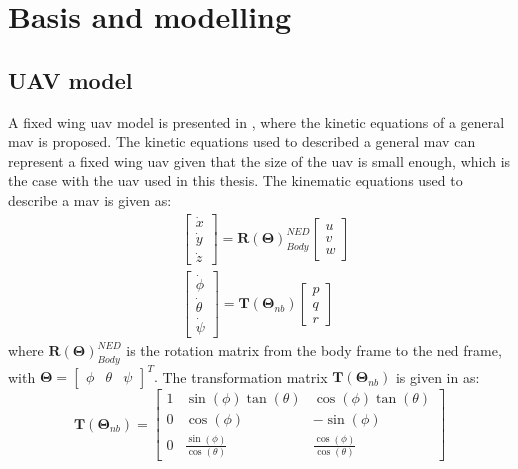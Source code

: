 \chapter{Basis and modelling}
\section{UAV model}
A fixed wing \gls{uav} model is presented in \citep{beard2012small}, where the kinetic equations of a general \gls{mav} is proposed. The kinetic equations used to described a general \gls{mav} can represent a fixed wing \gls{uav} given that the size of the \gls{uav} is small enough, which is the case with the \gls{uav} used in this thesis. The kinematic equations used to describe a \gls{mav} is given as:
\begin{subequations}
\label{eq:kinematics}
\begin{align}\label{eq:kinematicsPosition}
& \begin{bmatrix}
\dot{x} \\
\dot{y} \\
\dot{z}
\end{bmatrix}
=
 \mathbf{R}(\mathbf{\Theta})_{Body}^{NED}\begin{bmatrix}
 u \\
 v \\
 w
 \end{bmatrix} \\
& \begin{bmatrix}
\dot{\phi} \\
\dot{\theta} \\
\dot{\psi}
\end{bmatrix}
= 
\mathbf{T}(\mathbf{\Theta}_{nb})\begin{bmatrix}
p \\
q \\
r
\end{bmatrix}\label{eq:kinematicsAttitude}
\end{align}
\end{subequations}
where $\mathbf{R}(\mathbf{\Theta})_{Body}^{NED}$ is the rotation matrix from the body frame to the \gls{ned} frame, with $\mathbf{\Theta} = \begin{bmatrix}
\phi & \theta & \psi
\end{bmatrix}^T.$ The transformation matrix $\mathbf{T}(\mathbf{\Theta}_{nb})$ is given in \citep{fossen2011handbook} as:
\begin{equation}
\mathbf{T}(\mathbf{\Theta}_{nb}) = \begin{bmatrix}
1 & \sin(\phi)\tan(\theta) & \cos(\phi)\tan(\theta) \\
0 & \cos(\phi) & -\sin(\phi) \\
0 & \frac{\sin(\phi)}{\cos(\theta)} & \frac{\cos(\phi)}{\cos(\theta)}
\end{bmatrix}
\end{equation}
